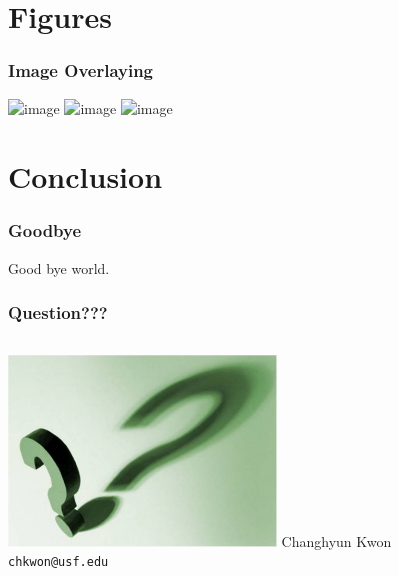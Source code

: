\documentclass[xcolor=dvipsnames, unicode, mathserif]{beamer}
\begin{document}
\section[Figures]{Figures}



\begin{frame}
\frametitle{Image Overlaying}
\begin{center}
\includegraphics<1>[width=0.7\textwidth]{image-a}
\includegraphics<2>[width=0.7\textwidth]{image-b}
\includegraphics<3>[width=0.7\textwidth]{image-c}
\end{center}
\end{frame}








\section[Conclusion]{Conclusion}


\begin{frame}
\frametitle{Goodbye}

Good bye world.

\end{frame}




\begin{frame}
\frametitle{Question???}
\begin{columns}[c]
\column{1.5in}
    \includegraphics[height=2in]{question}
\column{1.5in}
    Changhyun Kwon\\
    \texttt{chkwon@usf.edu}
\end{columns}
\end{frame}


%
%
\end{document}
